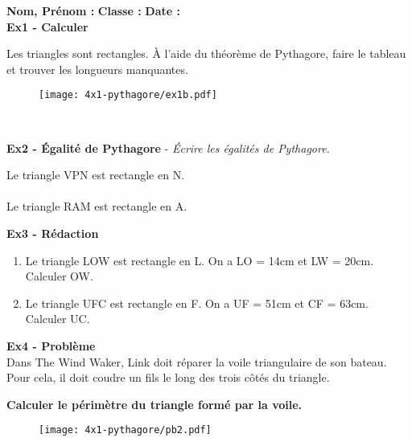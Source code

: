 \Pointilles[8]

\newpage

\textbf{Nom, Prénom :} \hspace{8cm} \textbf{Classe :} \hspace{3cm} \textbf{Date :}\\

\textbf{Ex1 - Calculer}

Les triangles sont rectangles. À l'aide du théorème de Pythagore, faire le tableau et trouver les longueurs manquantes. 

\begin{multicols}{3}

\begin{figure}[H]
  \centering
  \texttt{[image: 4x1-pythagore/ex1b.pdf]}
\end{figure} \columnbreak

\Pointilles[8] \columnbreak \\
\Pointilles[8]

\end{multicols}

\textbf{Ex2 - Égalité de Pythagore} - \textit{Écrire les égalités de Pythagore.}

\begin{multicols}{2}
Le triangle VPN est rectangle en N. \\ \Pointilles[1] \\
Le triangle RAM est rectangle en A. \\ \Pointilles[1] 
\end{multicols}

\textbf{Ex3 - Rédaction}

\begin{multicols}{2} \begin{enumerate}
  \item Le triangle LOW est rectangle en L. On a LO = 14cm et LW = 20cm. Calculer OW. \\ \Pointilles[7] \columnbreak
  \item Le triangle UFC est rectangle en F. On a UF = 51cm et CF = 63cm. Calculer UC. \\ \Pointilles[7]
\end{enumerate} \end{multicols} 

\begin{multicols}{2} 

\textbf{Ex4 - Problème} \\

Dans The Wind Waker, Link doit réparer la voile triangulaire de son bateau. Pour cela, il doit coudre un fils le long des trois côtés du triangle. 

\textbf{Calculer le périmètre du triangle formé par la voile.} 

\Pointilles[13] \columnbreak

\begin{figure}[H]
  \centering
  \texttt{[image: 4x1-pythagore/pb2.pdf]}
\end{figure}

\end{multicols}

